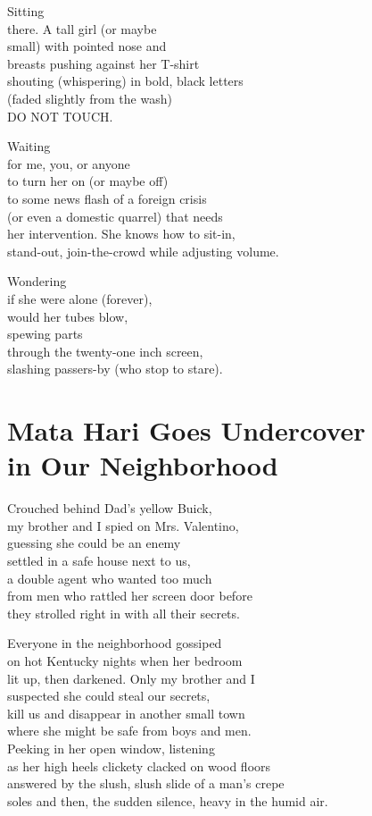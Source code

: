 \documentclass[twoside,10pt]{book}
\begin{document}
Sitting\\
there. A tall girl (or maybe\\
small) with pointed nose and\\
breasts pushing against her T-shirt\\
shouting (whispering) in bold, black letters\\
(faded slightly from the wash)\\
DO NOT TOUCH.

Waiting\\
for me, you, or anyone\\
to turn her on (or maybe off)\\
to some news flash of a foreign crisis\\
(or even a domestic quarrel) that needs\\
her intervention. She knows how to sit-in,\\
stand-out, join-the-crowd while adjusting volume.

Wondering\\
if she were alone (forever),\\
would her tubes blow,\\
spewing parts\\
through the twenty-one inch screen,\\
slashing passers-by (who stop to stare).


\clearpage
\section{Mata Hari Goes Undercover\\ in Our Neighborhood}

Crouched behind Dad's yellow Buick,\\
my brother and I spied on Mrs. Valentino,\\
guessing she could be an enemy\\
settled in a safe house next to us,\\
a double agent who wanted too much\\
from men who rattled her screen door before\\
they strolled right in with all their secrets.

Everyone in the neighborhood gossiped\\
on hot Kentucky nights when her bedroom\\
lit up, then darkened. Only my brother and I\\
suspected she could steal our secrets,\\
kill us and disappear in another small town\\
where she might be safe from boys and men.\\
Peeking in her open window, listening\\
as her high heels clickety clacked on wood floors\\
answered by the slush, slush slide of a man's crepe\\
soles and then, the sudden silence, heavy in the humid air.
\end{document}
